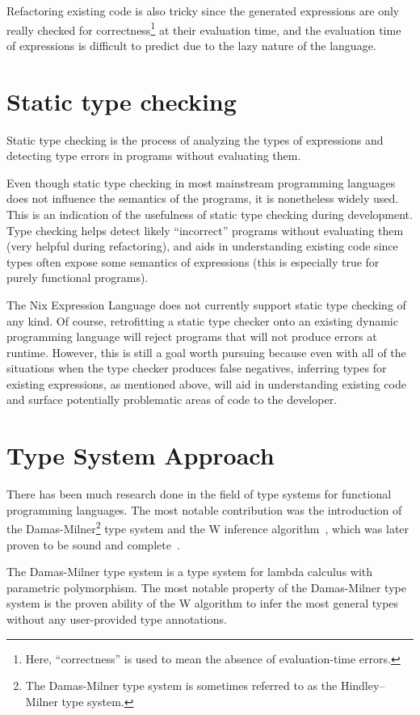 \documentclass[a4paper,conference]{IEEEtran}
\begin{document}
Refactoring existing code is also tricky since the generated expressions are only really checked for correctness\footnote{Here, ``correctness'' is used to mean the absence of evaluation-time errors.} at their evaluation time, and the evaluation time of expressions is difficult to predict due to the lazy nature of the language.

\section{Static type checking}

Static type checking is the process of analyzing the types of expressions and detecting type errors in programs without evaluating them.

Even though static type checking in most mainstream programming languages does not influence the semantics of the programs, it is nonetheless widely used. This is an indication of the usefulness of static type checking during development. Type checking helps detect likely ``incorrect'' programs without evaluating them (very helpful during refactoring), and aids in understanding existing code since types often expose some semantics of expressions (this is especially true for purely functional programs).

The Nix Expression Language does not currently support static type checking of any kind. Of course, retrofitting a static type checker onto an existing dynamic programming language will reject programs that will not produce errors at runtime. However, this is still a goal worth pursuing because even with all of the situations when the type checker produces false negatives, inferring types for existing expressions, as mentioned above, will aid in understanding existing code and surface potentially problematic areas of code to the developer.

\section{Type System Approach}

There has been much research done in the field of type systems for functional programming languages. The most notable contribution was the introduction of the Damas-Milner\footnote{The Damas-Milner type system is sometimes referred to as the Hindley–Milner type system.} type system and the W inference algorithm~\cite{damas1982principal}, which was later proven to be sound and complete~\cite{vaughanproof}.

The Damas-Milner type system is a type system for lambda calculus with parametric polymorphism. The most notable property of the Damas-Milner type system is the proven ability of the W algorithm to infer the most general types without any user-provided type annotations.
\end{document}
